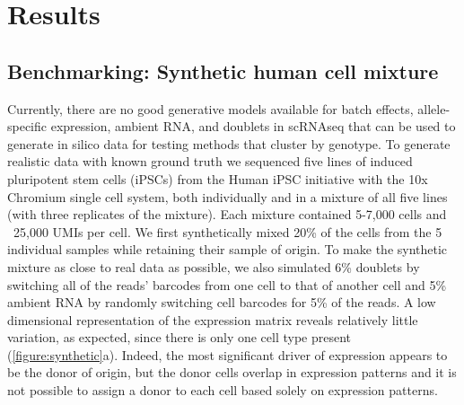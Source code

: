 \section{Results}



\subsection{Benchmarking: Synthetic human cell mixture}

Currently, there are no good generative models available for batch effects, allele-specific expression, ambient RNA, and doublets in scRNAseq that can be used to generate in silico data for testing methods that cluster by genotype. To generate realistic data with known ground truth we sequenced five lines of induced pluripotent stem cells (iPSCs) from the Human iPSC initiative\cite{hipsci} with the 10x Chromium single cell system, both individually and in a mixture of all five lines (with three replicates of the mixture). Each mixture contained 5-7,000 cells and ~25,000 UMIs per cell. We first synthetically mixed 20\% of the cells from the 5 individual samples while retaining their sample of origin. To make the synthetic mixture as close to real data as possible, we also simulated 6\% doublets by switching all of the reads' barcodes from one cell to that of another cell and 5\% ambient RNA by randomly switching cell barcodes for 5\% of the reads. A low dimensional representation of the expression matrix reveals relatively little variation, as expected, since there is only one cell type present (\ref{figure:synthetic}a). Indeed, the most significant driver of expression appears to be the donor of origin, but the donor cells overlap in expression patterns and it is not possible to assign a donor to each cell based solely on expression patterns.



